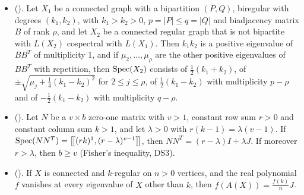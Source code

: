 \begin{itemize}
  $X_1$ is not regular, $X_2$ is regular and not bipartite, and $|V(X_1)|=|V(X_2)|+1$.
 \item {}
  (). Let $X_1$ be a connected graph
  with a bipartition $(P,Q)$, biregular with degrees $(k_1,k_2)$, with $k_1>k_2>0$,
  $p=|P|\le q=|Q|$ and biadjacency matrix $B$ of rank $\rho$, and let $X_2$ be a connected
  regular graph that is not bipartite with $L(X_2)$ cospectral with $L(X_1)$. Then $k_1k_2$ is a
  positive eigenvalue of $BB^T$ of multiplicity 1, and if $\mu_2,\dots,\mu_\rho$ are the other
  positive eigenvalues of $BB^T$ with repetition, then $\mathop{\mathrm{Spec}}\nolimits(X_2)$ consists of
  $\frac12(k_1+k_2)$, of $\pm\sqrt{\mu_j+\frac14(k_1-k_2)^2}$ for $2\le j\le\rho$, of
  $\frac12(k_1-k_2)$ with multiplicity $p-\rho$ and of $-\frac12(k_1-k_2)$ with multiplicity
  $q-\rho$.
 \item {}
  (). Let $N$ be a $v\times b$ zero-one matrix with
  $v>1$, constant row sum $r>0$ and constant column sum $k>1$, and let $\lambda>0$ with
  $r(k-1)=\lambda(v-1)$. If $\mathop{\mathrm{Spec}}\nolimits(NN^T)=\left[\!\left[(rk)^{1},(r-\lambda)^{v-1}\right]\!\right]$, then
  $NN^T=(r-\lambda)I+\lambda J$. If moreover $r>\lambda$, then $b\ge v$ (Fisher's inequality,
  DS3).
 \item {}
  (). If $X$ is connected
  and $k$-regular on $n>0$ vertices, and the real polynomial $f$ vanishes at every eigenvalue
  of $X$ other than $k$, then $f(A(X))=\frac{f(k)}{n}J$.
\end{itemize}
\endgroup

